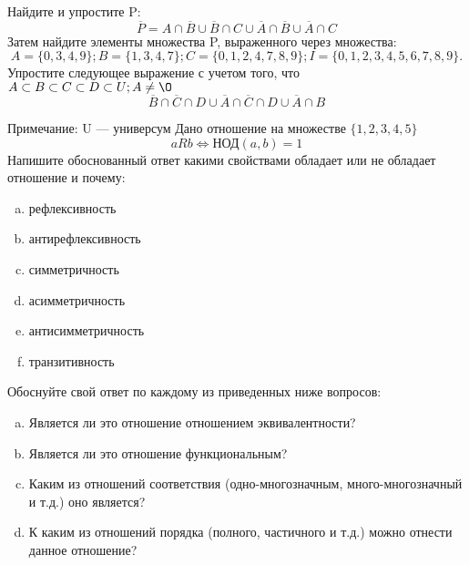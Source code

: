 \documentclass[10pt]{exam}
\begin{document}
\begin{questions}
\question
Найдите и упростите P:
\begin{equation*}
\overline{P} = A \cap \overline{B} \cup \overline{B} \cap C \cup \overline{A} \cap \overline{B} \cup \overline{A} \cap C
\end{equation*}
Затем найдите элементы множества P, выраженного через множества:
\begin{equation*}
A = \{0, 3, 4, 9\}; 
B = \{1, 3, 4, 7\};
C = \{0, 1, 2, 4, 7, 8, 9\};
I = \{0, 1, 2, 3, 4, 5, 6, 7, 8, 9\}.
\end{equation*}\question
Упростите следующее выражение с учетом того, что $A\subset B \subset C \subset D \subset U; A \neq \O$
\begin{equation*}
\overline{B} \cap \overline{C} \cap D \cup \overline{A} \cap \overline{C} \cap D \cup \overline{A} \cap B
\end{equation*}

Примечание: U — универсум\question
Дано отношение на множестве $\{1, 2, 3, 4, 5\}$ 
\begin{equation*}
aRb \iff  \text{НОД}(a,b) =1
\end{equation*}
Напишите обоснованный ответ какими свойствами обладает или не обладает отношение и почему:   
\begin{enumerate} [a)]\setcounter{enumi}{0}
\item рефлексивность
\item антирефлексивность
\item симметричность
\item асимметричность
\item антисимметричность
\item транзитивность
\end{enumerate}

Обоснуйте свой ответ по каждому из приведенных ниже вопросов:
\begin{enumerate} [a)]\setcounter{enumi}{0}
    \item Является ли это отношение отношением эквивалентности?
    \item Является ли это отношение функциональным?
    \item Каким из отношений соответствия (одно-многозначным, много-многозначный и т.д.) оно является?
    \item К каким из отношений порядка (полного, частичного и т.д.) можно отнести данное отношение?
\end{enumerate}



\end{questions}
\end{document}

